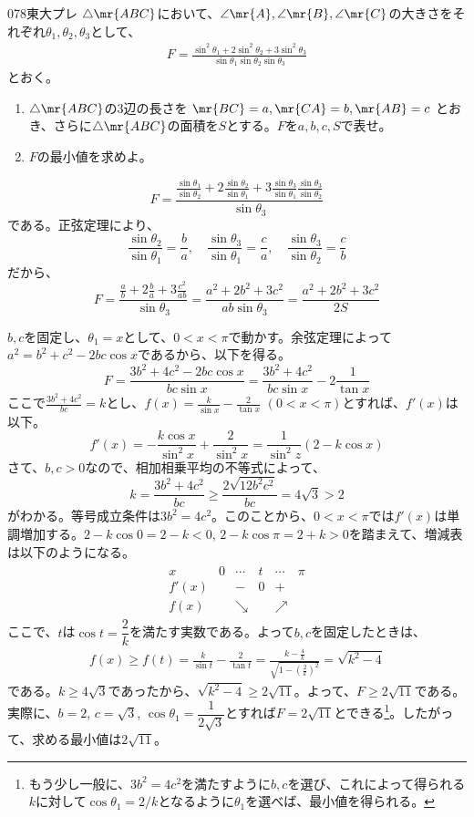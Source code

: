 \begin{thm}{078}{}{東大プレ}
 $\triangle\mr{ABC}$において、$\angle\mr{A}, \angle\mr{B}, \angle\mr{C}$の大きさをそれぞれ$\theta_1, \theta_2, \theta_3$として、
 \begin{align*}
  F=\frac{\sin^2\theta_1+2\sin^2\theta_2+3\sin^2\theta_3}{\sin\theta_1 \sin\theta_2 \sin\theta_3}
 \end{align*}
 とおく。
 \begin{enumerate}
  \item $\triangle\mr{ABC}$の3辺の長さを $\mr{BC}=a, \mr{CA}=b, \mr{AB}=c$ とおき、さらに$\triangle\mr{ABC}$の面積を$S$とする。$F$を$a, b, c, S$で表せ。
  \item $F$の最小値を求めよ。
 \end{enumerate}
\end{thm}

\[ F=\frac{\frac{\sin\theta_1}{\sin\theta_2}+2\frac{\sin\theta_2}{\sin\theta_1}+3\frac{\sin\theta_3}{\sin\theta_1}\frac{\sin\theta_3}{\sin\theta_2}}{\sin\theta_3} \]
である。正弦定理により、
\[ \frac{\sin\theta_2}{\sin\theta_1}=\frac{b}{a},\quad \frac{\sin\theta_3}{\sin\theta_1}=\frac{c}{a},\quad \frac{\sin\theta_3}{\sin\theta_2}=\frac{c}{b} \]
だから、
\[ F=\frac{\frac{a}{b}+2\frac{b}{a}+3\frac{c^2}{ab}}{\sin\theta_3}=\frac{a^2+2b^2+3c^2}{ab\sin\theta_3}=\frac{a^2+2b^2+3c^2}{2S} \]

$b, c$を固定し、$\theta_1=x$として、$0<x<\pi$で動かす。余弦定理によって$a^2=b^2+c^2-2bc\cos x$であるから、以下を得る。
\[ F=\frac{3b^2+4c^2-2bc\cos x}{bc\sin x}=\frac{3b^2+4c^2}{bc\sin x}-2\frac{1}{\tan x} \]
ここで$\frac{3b^2+4c^2}{bc}=k$とし、$f(x)=\frac{k}{\sin x}-\frac{2}{\tan x}$ $(0<x<\pi)$とすれば、$f'(x)$は以下。
\[ f'(x)=-\frac{k\cos x}{\sin^2 x}+\frac{2}{\sin^2 x}=\frac{1}{\sin^2 z}(2-k\cos x) \]
さて、$b, c>0$なので、相加相乗平均の不等式によって、
\[ k=\frac{3b^2+4c^2}{bc}\ge\frac{2\sqrt{12b^2c^2}}{bc}=4\sqrt{3}>2 \]
がわかる。等号成立条件は$3b^2=4c^2$。このことから、$0<x<\pi$では$f'(x)$は単調増加する。$2-k\cos 0=2-k<0$, $2-k\cos\pi=2+k>0$を踏まえて、増減表は以下のようになる。
\begin{align*}
 \begin{array}{c|c|c|c|c|c}
  x& 0 & \cdots & t & \cdots & \pi \\ \hline
  f'(x) & & - & 0 & + &  \\ \hline
  f(x) & & \searrow & & \nearrow & 
 \end{array}
\end{align*}
ここで、$t$は$\cos t=\dfrac{2}{k}$を満たす実数である。よって$b, c$を固定したときは、
\begin{align*}
 f(x)\ge f(t)=\frac{k}{\sin t} -\frac{2}{\tan t}=\frac{k-\frac{4}{k}}{\sqrt{1-\left(\frac{2}{k}\right)^2}}=\sqrt{k^2-4}
\end{align*}
である。$k\ge 4\sqrt{3}$であったから、$\sqrt{k^2-4}\ge 2\sqrt{11}$。よって、$F\ge 2\sqrt{11}$である。実際に、$b=2$, $c=\sqrt{3}$, $\cos\theta_1=\dfrac{1}{2\sqrt{3}}$とすれば$F=2\sqrt{11}$とできる\footnote{もう少し一般に、$3b^2=4c^2$を満たすように$b, c$を選び、これによって得られる$k$に対して$\cos\theta_1=2/k$となるように$\theta_1$を選べば、最小値を得られる。}。したがって、求める最小値は$2\sqrt{11}$。
